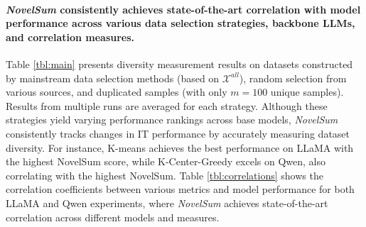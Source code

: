 \begin{table}[t!]
\centering
{}
\caption{Correlations between different metrics and model performance on LLaMA-3-8B and Qwen-2.5-7B.  “Avg.” denotes the average correlation (Eq. \ref{eq:cor}).}
\label{tbl:correlations}
\vspace{-2mm}
\end{table}

\paragraph{\textit{NovelSum} consistently achieves state-of-the-art correlation with model performance across various data selection strategies, backbone LLMs, and correlation measures.}
Table \ref{tbl:main} presents diversity measurement results on datasets constructed by mainstream data selection methods (based on $\mathcal{X}^{all}$), random selection from various sources, and duplicated samples (with only $m=100$ unique samples). 
Results from multiple runs are averaged for each strategy.
Although these strategies yield varying performance rankings across base models, \textit{NovelSum} consistently tracks changes in IT performance by accurately measuring dataset diversity. For instance, K-means achieves the best performance on LLaMA with the highest NovelSum score, while K-Center-Greedy excels on Qwen, also correlating with the highest NovelSum. Table \ref{tbl:correlations} shows the correlation coefficients between various metrics and model performance for both LLaMA and Qwen experiments, where \textit{NovelSum} achieves state-of-the-art correlation across different models and measures.

